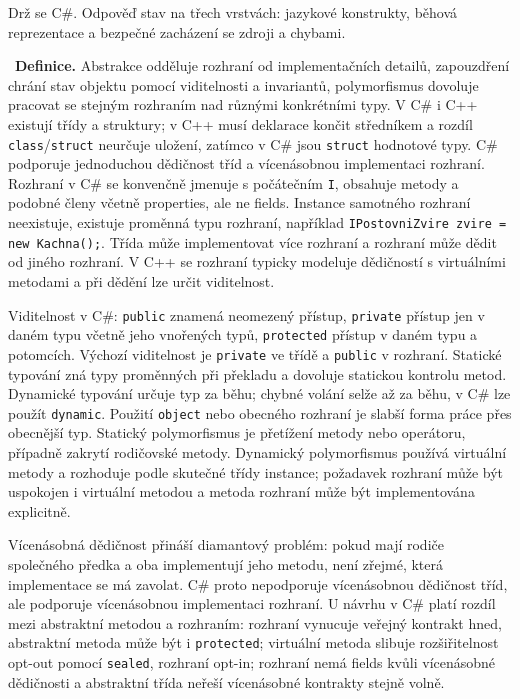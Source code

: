 \ucivo
\begin{intuice}
Drž se C\#. Odpověď stav na třech vrstvách: jazykové konstrukty, běhová reprezentace
a bezpečné zacházení se zdroji a chybami.
\end{intuice}

\begin{odpoved}
\setlength{\parskip}{2pt}
\noindent{}\ \textbf{Definice.}
Abstrakce odděluje rozhraní od implementačních detailů, zapouzdření chrání stav objektu
pomocí viditelnosti a invariantů, polymorfismus dovoluje pracovat se stejným rozhraním
nad různými konkrétními typy. V C\# i C++ existují třídy a struktury; v C++ musí
deklarace končit středníkem a rozdíl \texttt{class}/\texttt{struct} neurčuje uložení,
zatímco v C\# jsou \texttt{struct} hodnotové typy. C\# podporuje jednoduchou dědičnost
tříd a vícenásobnou implementaci rozhraní. Rozhraní v C\# se konvenčně jmenuje s
počátečním \texttt{I}, obsahuje metody a podobné členy včetně properties, ale ne fields.
Instance samotného rozhraní neexistuje, existuje proměnná typu rozhraní, například
\texttt{IPostovniZvire zvire = new Kachna();}. Třída může implementovat více rozhraní
a rozhraní může dědit od jiného rozhraní. V C++ se rozhraní typicky modeluje
dědičností s virtuálními metodami a při dědění lze určit viditelnost.

Viditelnost v C\#: \texttt{public} znamená neomezený přístup, \texttt{private} přístup
jen v daném typu včetně jeho vnořených typů, \texttt{protected} přístup v daném typu a
potomcích. Výchozí viditelnost je \texttt{private} ve třídě a \texttt{public} v
rozhraní. Statické typování zná typy proměnných při překladu a dovoluje statickou
kontrolu metod. Dynamické typování určuje typ za běhu; chybné volání selže až za běhu,
v C\# lze použít \texttt{dynamic}. Použití \texttt{object} nebo obecného rozhraní je
slabší forma práce přes obecnější typ. Statický polymorfismus je přetížení metody nebo
operátoru, případně zakrytí rodičovské metody. Dynamický polymorfismus používá
virtuální metody a rozhoduje podle skutečné třídy instance; požadavek rozhraní může být
uspokojen i virtuální metodou a metoda rozhraní může být implementována explicitně.

Vícenásobná dědičnost přináší diamantový problém: pokud mají rodiče společného předka a
oba implementují jeho metodu, není zřejmé, která implementace se má zavolat. C\# proto
nepodporuje vícenásobnou dědičnost tříd, ale podporuje vícenásobnou implementaci
rozhraní. U návrhu v C\# platí rozdíl mezi abstraktní metodou a rozhraním: rozhraní
vynucuje veřejný kontrakt hned, abstraktní metoda může být i \texttt{protected};
virtuální metoda slibuje rozšiřitelnost opt-out pomocí \texttt{sealed}, rozhraní opt-in;
rozhraní nemá fields kvůli vícenásobné dědičnosti a abstraktní třída neřeší vícenásobné
kontrakty stejně volně.


\end{odpoved}
